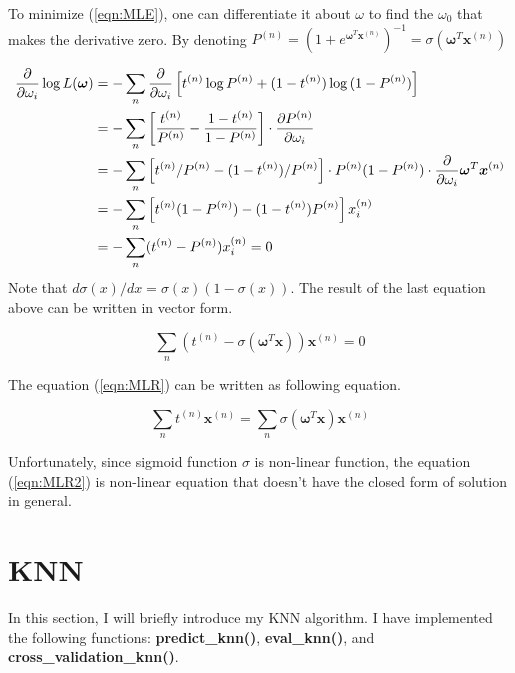 \documentclass[12pt]{article}
\begin{document}
To minimize (\ref{eqn:MLE}), one can differentiate it about $\omega$ to find the $\omega_0$ that makes the derivative zero. By denoting $P^{(n)} = ({1+e^{\boldsymbol{\omega}^T \boldsymbol{x}^{(n)}}})^{-1} = \sigma(\boldsymbol{\omega}^T\boldsymbol{x}^{(n)})$


\begin{align*}
    {\partial \over \partial \omega_i}\log{L(\boldsymbol{\omega})} &= -\sum_n{\partial \over \partial \omega_i}\left[t^{(n)}\log{P^{(n)}} + (1-t^{(n)})\log{(1-P^{(n)})}\right] \\ &= - \sum_n\left[\frac{t^{(n)}}{{P^{(n)}}} - \frac{1-t^{(n)}}{1-P^{(n)}}\right]\cdot {\partial P^{(n)} \over \partial \omega_i} \\ &= -\sum_n\left[t^{(n)}/P^{(n)} - (1-t^{(n)})/P^{(n)}\right]\cdot P^{(n)}(1-P^{(n)})\cdot {\partial \over \partial \omega_i} \boldsymbol{\omega}^T\boldsymbol{x}^{(n)} \\ &= -\sum_n\left[t^{(n)}(1-P^{(n)}) - (1-t^{(n)})P^{(n)} \right]x_i^{(n)} \\ &= - \sum_n(t^{(n)} - P^{(n)})x_i^{(n)} = 0
\end{align*}
Note that ${d\sigma(x)/ dx} = \sigma(x)(1-\sigma(x))$.
The result of the last equation above can be written in vector form.

\begin{equation}
    \sum_n\left(t^{(n)} - \sigma(\boldsymbol{\omega}^T\boldsymbol{x})\right)\boldsymbol{x}^{(n)} = 0
    \label{eqn:MLR}
\end{equation}

The equation (\ref{eqn:MLR}) can be written as following equation.

\begin{equation}
    \sum_n t^{(n)}\boldsymbol{x}^{(n)} = \sum_n\sigma(\boldsymbol{\omega}^T\boldsymbol{x})\boldsymbol{x}^{(n)}
    \label{eqn:MLR2}
\end{equation}

Unfortunately, since sigmoid function $\sigma$ is non-linear function, the equation (\ref{eqn:MLR2}) is non-linear equation that doesn't have the closed form of solution in general.

\section{KNN}

In this section, I will briefly introduce my KNN algorithm. I have implemented the following functions: \textbf{predict\_knn()}, \textbf{eval\_knn()}, and \textbf{cross\_validation\_knn()}.
\end{document}

